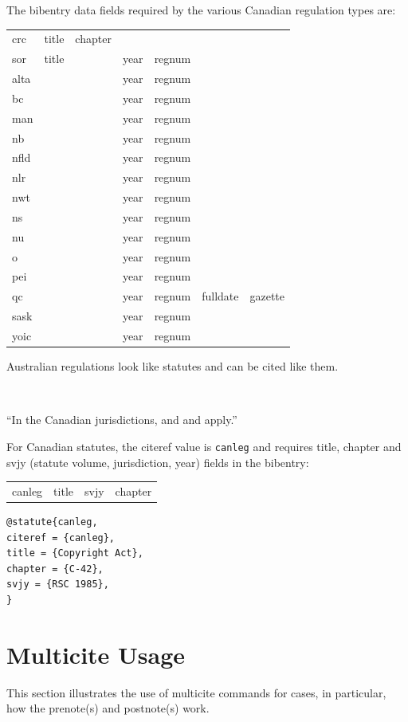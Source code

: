 The bibentry data fields required by the various Canadian regulation types are:
\bigskip

\begin{tabular}{lllllll}
crc & title & chapter &&&& \\
sor & title && year & regnum && \\
alta & && year & regnum && \\
bc &  && year & regnum && \\
man & && year & regnum && \\
nb &  && year & regnum && \\
nfld &  && year & regnum && \\
nlr &  && year & regnum && \\
nwt &  && year & regnum && \\
ns &  && year & regnum && \\
nu &  && year & regnum && \\
o &  && year & regnum && \\
pei &  && year & regnum && \\
qc &  && year & regnum & fulldate & gazette\\
sask &  && year & regnum && \\
yoic &  && year & regnum && \\
\end{tabular}

\bigskip

Australian regulations look like statutes and can be cited like them.
\bigskip

\hfill * \hfill\ 
\bigskip

``In the Canadian jurisdictions, 
 and 
 and
 apply.''
\bigskip

For Canadian statutes, the citeref value is \verb|canleg| and requires title, chapter and svjy (statute volume, jurisdiction, year) fields in the bibentry:
\bigskip

\begin{tabular}{llll}
canleg & title & svjy & chapter \\
\end{tabular}
\bigskip

\begin{verbatim}
@statute{canleg,
citeref = {canleg},
title = {Copyright Act},
chapter = {C-42},
svjy = {RSC 1985},
}
\end{verbatim}



\section{Multicite Usage}
This section illustrates the use of multicite commands for cases, in particular, how the prenote(s) and postnote(s) work.

